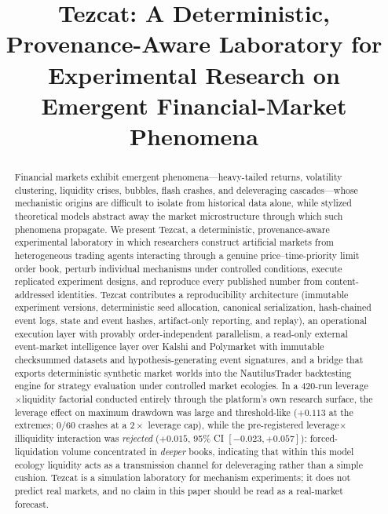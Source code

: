 \documentclass[conference]{IEEEtran}
\newcommand{\tez}{Tezcat}
\begin{document}
\title{Tezcat: A Deterministic, Provenance-Aware Laboratory for
Experimental Research on Emergent Financial-Market Phenomena}

\author{
}

\maketitle

\begin{abstract}
Financial markets exhibit emergent phenomena---heavy-tailed returns,
volatility clustering, liquidity crises, bubbles, flash crashes, and
deleveraging cascades---whose mechanistic origins are difficult to
isolate from historical data alone, while stylized theoretical models
abstract away the market microstructure through which such phenomena
propagate. We present \tez{}, a deterministic, provenance-aware
experimental laboratory in which researchers construct artificial
markets from heterogeneous trading agents interacting through a genuine
price--time-priority limit order book, perturb individual mechanisms
under controlled conditions, execute replicated experiment designs, and
reproduce every published number from content-addressed identities.
\tez{} contributes a reproducibility architecture (immutable experiment
versions, deterministic seed allocation, canonical serialization,
hash-chained event logs, state and event hashes, artifact-only
reporting, and replay), an operational execution layer with provably
order-independent parallelism, a read-only external event-market
intelligence layer over Kalshi and Polymarket with immutable
checksummed datasets and hypothesis-generating event signatures, and a
bridge that exports deterministic synthetic market worlds into the
NautilusTrader backtesting engine for strategy evaluation under
controlled market ecologies. In a 420-run leverage$\times$liquidity
factorial conducted entirely through the platform's own research
surface, the leverage effect on maximum drawdown was large and
threshold-like ($+0.113$ at the extremes; $0/60$ crashes at a
$2\times$ leverage cap), while the pre-registered
leverage$\times$illiquidity interaction was \emph{rejected}
($+0.015$, 95\% CI $[-0.023, +0.057]$): forced-liquidation volume
concentrated in \emph{deeper} books, indicating that within this model
ecology liquidity acts as a transmission channel for deleveraging
rather than a simple cushion. \tez{} is a simulation laboratory for
mechanism experiments; it does not predict real markets, and no claim
in this paper should be read as a real-market forecast.
\end{abstract}
\end{document}
